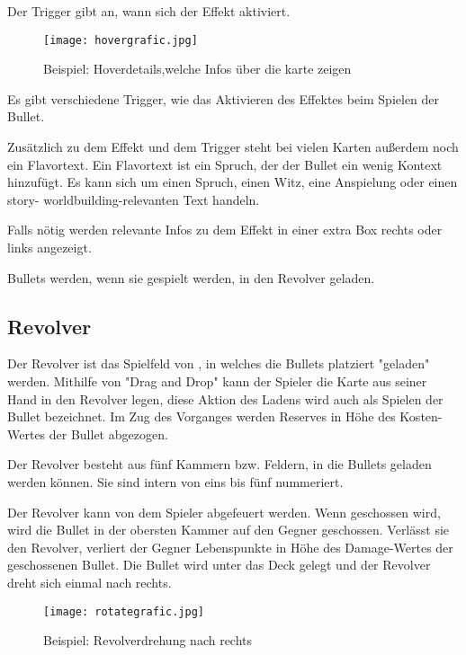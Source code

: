 Der Trigger gibt an, wann sich der Effekt aktiviert.


\begin{figure}[H]
    \centering
    \texttt{[image: hovergrafic.jpg]}
    \caption{Beispiel: Hoverdetails,welche Infos über die karte zeigen}
\end{figure}



Es gibt verschiedene Trigger, wie \zB das Aktivieren des Effektes beim Spielen der Bullet.


Zusätzlich zu dem Effekt und dem Trigger steht bei vielen Karten außerdem noch ein Flavortext.
Ein Flavortext ist ein Spruch, der der Bullet ein wenig Kontext hinzufügt.
Es kann sich um einen Spruch, einen Witz, eine Anspielung oder einen story- \bzw worldbuilding-relevanten Text handeln.


Falls nötig werden relevante Infos zu dem Effekt in einer extra Box rechts oder links angezeigt.


Bullets werden, wenn sie gespielt werden, in den Revolver geladen.


\subsection{Revolver}\label{der_revolver}

Der Revolver ist das Spielfeld von \FF, in welches die Bullets platziert \bzw "geladen" werden.
Mithilfe von "Drag and Drop" kann der Spieler die Karte aus seiner Hand in den Revolver legen, diese Aktion des Ladens wird auch als Spielen der Bullet bezeichnet.
Im Zug des Vorganges werden Reserves in Höhe des Kosten-Wertes der Bullet abgezogen.


Der Revolver besteht aus fünf Kammern bzw. Feldern, in die Bullets geladen werden können.
Sie sind intern von eins bis fünf nummeriert.


Der Revolver kann von dem Spieler abgefeuert werden. Wenn geschossen wird, wird die Bullet in der obersten Kammer auf den Gegner geschossen.
Verlässt sie den Revolver, verliert der Gegner Lebenspunkte in Höhe des Damage-Wertes der geschossenen Bullet.
Die Bullet wird unter das Deck gelegt und der Revolver dreht sich einmal nach rechts.

\begin{figure}[H]
    \centering
    \texttt{[image: rotategrafic.jpg]}
    \caption{Beispiel: Revolverdrehung nach rechts}
\end{figure}



